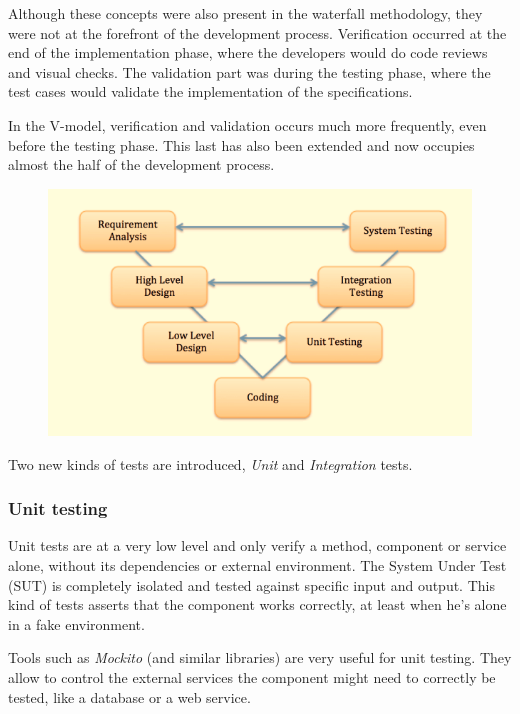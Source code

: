 Although these concepts were also present in the waterfall methodology, they
were not at the forefront of the development process.
Verification occurred at the end of the implementation phase, where the
developers would do code reviews and visual checks.
The validation part was during the testing phase, where the test cases
would validate the implementation of the specifications.

In the V-model, verification and validation occurs much more frequently,
even before the testing phase.
This last has also been extended and now occupies almost the half of the
development process.

\begin{figure}
    \includegraphics[width=\textwidth]{../../images/waterfall/v_model.png}
\end{figure}

Two new kinds of tests are introduced, \textit{Unit} and \textit{Integration}
tests.

\subsubsection{Unit testing}
Unit tests are at a very low level and only verify  a method, component or
service alone, without its dependencies or external environment.
The System Under Test (SUT) is completely isolated and tested against specific
input and output.
This kind of tests asserts that the component works correctly, at least when
he's alone in a fake environment.

Tools such as \textit{Mockito} (and similar libraries) are very useful for
unit testing.
They allow to control the external services the component might need to
correctly be tested, like a database or a web service.

